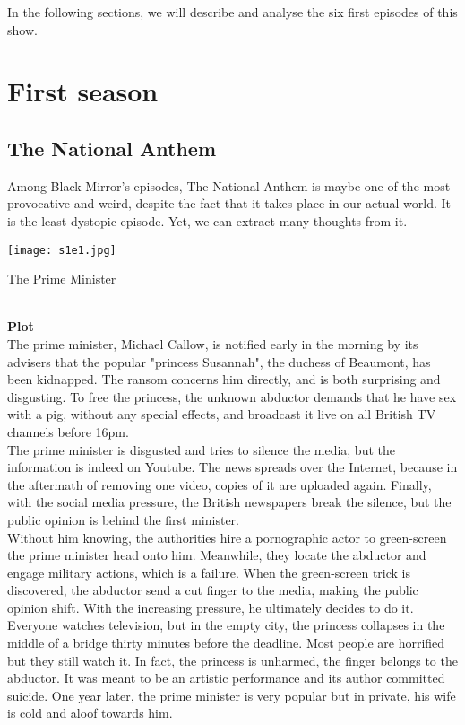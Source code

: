 \documentclass{article}
\begin{document}
In the following sections, we will describe and analyse the six first episodes of this show.


\newpage

\section{First season}

\subsection{The National Anthem}
Among Black Mirror's episodes, The National Anthem is maybe one of the most provocative and weird, despite the fact that it takes place in our actual world. 
It is the least dystopic episode. Yet, we can extract many thoughts from it.


\begin{center}
\texttt{[image: s1e1.jpg]}
\caption{The Prime Minister}
\end{center}\\

\textbf{Plot} \\
The prime minister, Michael Callow, is notified early in the morning by its advisers that the popular "princess Susannah", the duchess of Beaumont, has been kidnapped. The ransom concerns him directly, and is both surprising and disgusting. To free the princess, the unknown abductor demands that he have sex with a pig, without any special effects, and broadcast it live on all British TV channels before 16pm. \\
The prime minister is disgusted and tries to silence the media, but the information is indeed on Youtube. The news spreads over the Internet, because in the aftermath of removing one video, copies of it are uploaded again. Finally, with the social media pressure, the British newspapers break the silence, but the public opinion is behind the first minister. \\
Without him knowing, the authorities hire a pornographic actor to green-screen the prime minister head onto him. Meanwhile, they locate the abductor and engage military actions, which is a failure. When the green-screen trick is discovered, the abductor send a cut finger to the media, making the public opinion shift. With the increasing pressure, he ultimately decides to do it.\\
Everyone watches television, but in the empty city, the princess collapses in the middle of a bridge thirty minutes before the deadline.
Most people are horrified but they still watch it. In fact, the princess is unharmed, the finger belongs to the abductor. It was meant to be an artistic performance and its author committed suicide. One year later, the prime minister is very popular but in private, his wife is cold and aloof towards him.
\end{document}

